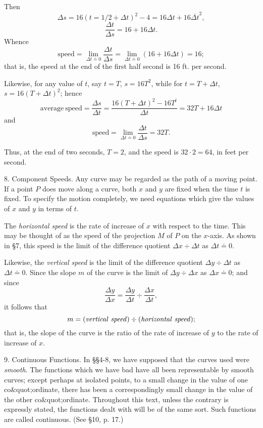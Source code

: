 \documentclass[12pt]{article}
\begin{document}
Then
$$
\Delta s = 16 (t = 1/2 + \Delta t)^2 - 4
= 16 \Delta t + 16 \overline{\Delta t}^2,
$$
$$
\frac{\Delta t}{\Delta s} = 16 + 16 \Delta t.
$$
Whence
$$
\mathrm{speed} = \lim_{\Delta t \doteq 0} \frac{\Delta t}{\Delta s} =
\lim_{\Delta t \doteq 0}(16 + 16 \Delta t) = 16 ;
$$
that is, the speed at the end of the first half second is 16 ft. per second. 

Likewise, for any value of $t$, say $t=T$, $s=16T^2$, while for
$t = T+\Delta t$, $s = 16(T+\Delta t)^2$; hence
$$
\mathrm{average\ speed}=\frac{\Delta s}{\Delta t}=\frac{16(T+\Delta t)^{2}-16T^{l}}{\Delta t}=32T+16 \Delta t
$$
and 
$$
\mathrm{speed} = \lim_{\Delta t \doteq 0} \frac{\Delta t}{\Delta s} =32T.
$$

Thus, at the end of two seconds, $T=2$, and the speed is $32 \cdot 2=64$, 
in feet per second.


8. Component Speeds.  Any curve may be regarded as the
path of a moving point.  If a point $P$ does move along a curve,
both $x$ and $y$ are fixed when the time $t$ is fixed.  To specify
the motion completely, we need equations which give the values
of $x$ and $y$ in terms of $t$. 

The {\it horizontal speed} is the rate of increase of $x$ with
respect to the time.  This may be thought of as the speed of
the projection $M$ of $P$ on the $x$-axis.  As shown in \S 7,
this speed is the limit of the difference quotient
$\Delta x \div \Delta t$ as $\Delta t \doteq 0$.

Likewise, the {\it vertical speed} is the limit of the difference quotient
$\Delta y \div \Delta t$ as $\Delta t \doteq 0$.  Since the slope
$m$ of the curve is the limit of $\Delta y \div \Delta x$ as
$\Delta x \doteq 0$; and since
$$
\frac{\Delta y}{\Delta x} = 
\frac{\Delta y}{\Delta t} \div \frac{\Delta x}{\Delta t},
$$
it follows that
$$
 m=({\it vertical\ speed}) \div ({\it horizontal\ speed});
$$
that is, the slope of the curve is the ratio of the rate of increase
of $y$ to the rate of increase of $x$.

9. Continuous Functions.
In \S\S 4-8, we have supposed that
the curves used were {\it smooth}. The functions which we have
bad have all been representable by smooth curves; except
perhaps at isolated points, to a small change in the value of
one co\&quot;{o}rdinate, there has been a correspondingly small change
in the value of the other co\&quot;{o}rdinate. Throughout this text,
unless the contrary is expressly stated, the functions dealt with
will be of the same sort. Such functions are called continuous.
(See \S 10, p. 17.)
\end{document}
